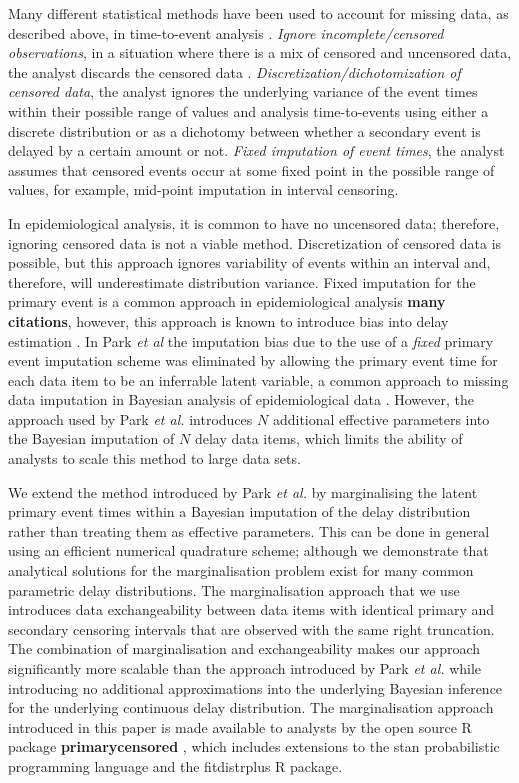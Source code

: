 \documentclass[10pt,letterpaper]{article}
\begin{document}
Many different statistical methods have been used to account for missing data, as described above, in time-to-event analysis \cite{leung1997censoring}. \textit{Ignore incomplete/censored observations}, in a situation where there is a mix of censored and uncensored data, the analyst discards the censored data \cite{little2019statistical}. \textit{Discretization/dichotomization of censored data}, the analyst ignores the underlying variance of the event times within their possible range of values and analysis time-to-events using either a discrete distribution or as a dichotomy between whether a secondary event is delayed by a certain amount or not. \textit{Fixed imputation of event times}, the analyst assumes that censored events occur at some fixed point in the possible range of values, for example, mid-point imputation in interval censoring. 

In epidemiological analysis, it is common to have no uncensored data; therefore, ignoring censored data is not a viable method. Discretization of censored data is possible, but this approach ignores variability of events within an interval and, therefore, will underestimate distribution variance. Fixed imputation for the primary event is a common approach in epidemiological analysis \textbf{many citations}, however, this approach is known to introduce bias into delay estimation \cite{law1992effects,Park2024.01.12.24301247}. In Park \textit{et al} \cite{Park2024.01.12.24301247} the imputation bias due to the use of a \textit{fixed} primary event imputation scheme was eliminated by allowing the primary event time for each data item to be an inferrable latent variable, a common approach to missing data imputation in Bayesian analysis of epidemiological data \cite{o1999bayesian}. However, the approach used by Park \textit{ et al.} introduces $N$ additional effective parameters into the Bayesian imputation of $N$ delay data items, which limits the ability of analysts to scale this method to large data sets.

We extend the method introduced by Park \textit{ et al.} by marginalising the latent primary event times within a Bayesian imputation of the delay distribution rather than treating them as effective parameters. This can be done in general using an efficient numerical quadrature scheme; although we demonstrate that analytical solutions for the marginalisation problem exist for many common parametric delay distributions. The marginalisation approach that we use introduces data exchangeability \cite{gelman_bayesian_2013} between data items with identical primary and secondary censoring intervals that are observed with the same right truncation. The combination of marginalisation and exchangeability makes our approach significantly more scalable than the approach introduced by Park \textit{ et al.} \cite{Park2024.01.12.24301247} while introducing no additional approximations into the underlying Bayesian inference for the underlying continuous delay distribution. The marginalisation approach introduced in this paper is made available to analysts by the open source R package \textbf{primarycensored} \cite{abbottprimarycensored}, which includes extensions to the stan probabilistic programming language and the fitdistrplus R package.
\end{document}
